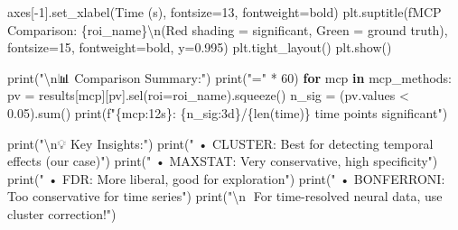 \documentclass[
  11pt,
  letterpaper,
  oneside,
  openany]{book}
\newenvironment{Shaded}{\begin{snugshade}}{\end{snugshade}}
\newcommand{\BuiltInTok}[1]{\textcolor[rgb]{0.00,0.23,0.31}{#1}}
\newcommand{\CharTok}[1]{\textcolor[rgb]{0.13,0.47,0.30}{#1}}
\newcommand{\ControlFlowTok}[1]{\textcolor[rgb]{0.00,0.23,0.31}{\textbf{#1}}}
\newcommand{\DecValTok}[1]{\textcolor[rgb]{0.68,0.00,0.00}{#1}}
\newcommand{\FloatTok}[1]{\textcolor[rgb]{0.68,0.00,0.00}{#1}}
\newcommand{\KeywordTok}[1]{\textcolor[rgb]{0.00,0.23,0.31}{\textbf{#1}}}
\newcommand{\NormalTok}[1]{\textcolor[rgb]{0.00,0.23,0.31}{#1}}
\newcommand{\OperatorTok}[1]{\textcolor[rgb]{0.37,0.37,0.37}{#1}}
\newcommand{\SpecialCharTok}[1]{\textcolor[rgb]{0.37,0.37,0.37}{#1}}
\newcommand{\SpecialStringTok}[1]{\textcolor[rgb]{0.13,0.47,0.30}{#1}}
\newcommand{\StringTok}[1]{\textcolor[rgb]{0.13,0.47,0.30}{#1}}
\begin{document}
\begin{Shaded}
\begin{Highlighting}[]
\NormalTok{axes[}\OperatorTok{{-}}\DecValTok{1}\NormalTok{].set\_xlabel(}\StringTok{\textquotesingle{}Time (s)\textquotesingle{}}\NormalTok{, fontsize}\OperatorTok{=}\DecValTok{13}\NormalTok{, fontweight}\OperatorTok{=}\StringTok{\textquotesingle{}bold\textquotesingle{}}\NormalTok{)}
\NormalTok{plt.suptitle(}\SpecialStringTok{f\textquotesingle{}MCP Comparison: }\SpecialCharTok{\{}\NormalTok{roi\_name}\SpecialCharTok{\}}\CharTok{\textbackslash{}n}\SpecialStringTok{(Red shading = significant, Green = ground truth)\textquotesingle{}}\NormalTok{, }
\NormalTok{             fontsize}\OperatorTok{=}\DecValTok{15}\NormalTok{, fontweight}\OperatorTok{=}\StringTok{\textquotesingle{}bold\textquotesingle{}}\NormalTok{, y}\OperatorTok{=}\FloatTok{0.995}\NormalTok{)}
\NormalTok{plt.tight\_layout()}
\NormalTok{plt.show()}

\BuiltInTok{print}\NormalTok{(}\StringTok{"}\CharTok{\textbackslash{}n}\StringTok{📊 Comparison Summary:"}\NormalTok{)}
\BuiltInTok{print}\NormalTok{(}\StringTok{"="} \OperatorTok{*} \DecValTok{60}\NormalTok{)}
\ControlFlowTok{for}\NormalTok{ mcp }\KeywordTok{in}\NormalTok{ mcp\_methods:}
\NormalTok{    pv }\OperatorTok{=}\NormalTok{ results[mcp][}\StringTok{\textquotesingle{}pv\textquotesingle{}}\NormalTok{].sel(roi}\OperatorTok{=}\NormalTok{roi\_name).squeeze()}
\NormalTok{    n\_sig }\OperatorTok{=}\NormalTok{ (pv.values }\OperatorTok{\textless{}} \FloatTok{0.05}\NormalTok{).}\BuiltInTok{sum}\NormalTok{()}
    \BuiltInTok{print}\NormalTok{(}\SpecialStringTok{f"}\SpecialCharTok{\{}\NormalTok{mcp}\SpecialCharTok{:12s\}}\SpecialStringTok{: }\SpecialCharTok{\{}\NormalTok{n\_sig}\SpecialCharTok{:3d\}}\SpecialStringTok{/}\SpecialCharTok{\{}\BuiltInTok{len}\NormalTok{(time)}\SpecialCharTok{\}}\SpecialStringTok{ time points significant"}\NormalTok{)}

\BuiltInTok{print}\NormalTok{(}\StringTok{"}\CharTok{\textbackslash{}n}\StringTok{💡 Key Insights:"}\NormalTok{)}
\BuiltInTok{print}\NormalTok{(}\StringTok{"   • CLUSTER: Best for detecting temporal effects (our case)"}\NormalTok{)}
\BuiltInTok{print}\NormalTok{(}\StringTok{"   • MAXSTAT: Very conservative, high specificity"}\NormalTok{)}
\BuiltInTok{print}\NormalTok{(}\StringTok{"   • FDR: More liberal, good for exploration"}\NormalTok{)}
\BuiltInTok{print}\NormalTok{(}\StringTok{"   • BONFERRONI: Too conservative for time series"}\NormalTok{)}
\BuiltInTok{print}\NormalTok{(}\StringTok{"}\CharTok{\textbackslash{}n}\StringTok{🎯 For time{-}resolved neural data, use \textquotesingle{}cluster\textquotesingle{} correction!"}\NormalTok{)}
\end{Highlighting}
\end{Shaded}
\end{document}
